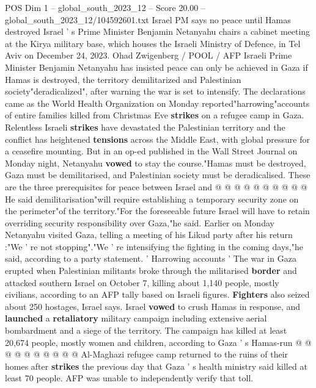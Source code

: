 \begin{textsample}{POS Dim 1 – global\_south\_2023\_12 – Score 20.00 – global\_south\_2023\_12/104592601.txt}  \label{ex:f1_pos_169}
Israel PM says no peace until Hamas destroyed Israel ' s Prime Minister Benjamin Netanyahu chairs a cabinet meeting at the Kirya military base, which houses the Israeli Ministry of Defence, in Tel Aviv on December 24, 2023.
Ohad Zwigenberg / POOL / AFP Israeli Prime Minister Benjamin Netanyahu has insisted peace can only be achieved in Gaza if Hamas is destroyed, the territory demilitarized and Palestinian society"deradicalized", after warning the war is set to intensify.
The declarations came as the World Health Organization on Monday reported"harrowing"accounts of entire families killed from Christmas Eve \textbf{strikes} on a refugee camp in Gaza.
Relentless Israeli \textbf{strikes} have devastated the Palestinian territory and the conflict has heightened \textbf{tensions} across the Middle East, with global pressure for a ceasefire mounting.
But in an op-ed published in the Wall Street Journal on Monday night, Netanyahu \textbf{vowed} to stay the course."Hamas must be destroyed, Gaza must be demilitarised, and Palestinian society must be deradicalised.
These are the three prerequisites for peace between Israel and @ @ @ @ @ @ @ @ @ @ He said demilitarisation"will require establishing a temporary security zone on the perimeter"of the territory."For the foreseeable future Israel will have to retain overriding security responsibility over Gaza,"he said.
Earlier on Monday Netanyahu visited Gaza, telling a meeting of his Likud party after his return :"We ' re not stopping"."We ' re intensifying the fighting in the coming days,"he said, according to a party statement. ' Harrowing accounts ' The war in Gaza erupted when Palestinian militants broke through the militarised \textbf{border} and attacked southern Israel on October 7, killing about 1,140 people, mostly civilians, according to an AFP tally based on Israeli figures. \textbf{Fighters} also seized about 250 hostages, Israel says.
Israel \textbf{vowed} to crush Hamas in response, and \textbf{launched} a \textbf{retaliatory} military campaign including extensive aerial bombardment and a siege of the territory.
The campaign has killed at least 20,674 people, mostly women and children, according to Gaza ' s Hamas-run @ @ @ @ @ @ @ @ @ @ Al-Maghazi refugee camp returned to the ruins of their homes after \textbf{strikes} the previous day that Gaza ' s health ministry said killed at least 70 people.
AFP was unable to independently verify that toll.

\end{textsample}
